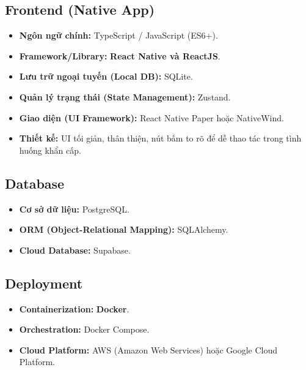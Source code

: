 \documentclass[a4paper,12pt]{article}
\begin{document}
\subsection{Frontend (Native App)}
\begin{itemize}
    \item \textbf{Ngôn ngữ chính:} TypeScript / JavaScript (ES6+).
    \item \textbf{Framework/Library:} \textbf{React Native và ReactJS}. 
    \item \textbf{Lưu trữ ngoại tuyến (Local DB):} SQLite.
    \item \textbf{Quản lý trạng thái (State Management):} Zustand.
    \item \textbf{Giao diện (UI Framework):} React Native Paper hoặc NativeWind.
    \item \textbf{Thiết kế:} UI tối giản, thân thiện, nút bấm to rõ để dễ thao tác trong tình huống khẩn cấp.
\end{itemize}

\subsection{Database}
\begin{itemize}
    \item \textbf{Cơ sở dữ liệu:} PostgreSQL.
    \item \textbf{ORM (Object-Relational Mapping):} SQLAlchemy.
    \item \textbf{Cloud Database:} Supabase.
\end{itemize}

\subsection{Deployment}
\begin{itemize}
    \item \textbf{Containerization:} \textbf{Docker}.
    \item \textbf{Orchestration:} Docker Compose.
    \item \textbf{Cloud Platform:} AWS (Amazon Web Services) hoặc Google Cloud Platform.
\end{itemize}
\end{document}

